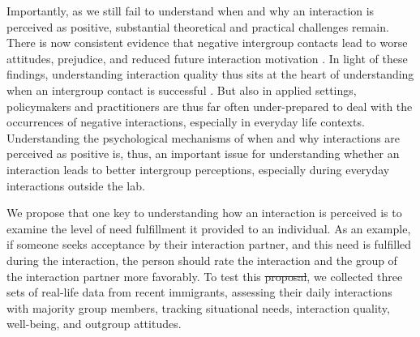 \documentclass[man, 12pt, a4paper, mask]{apa7}
\theoremstyle{break}
\theoremstyle{plain}
\providecommand{\DIFaddtex}[1]{{\protect\color{blue}\uwave{#1}}} %
\providecommand{\DIFdeltex}[1]{{\protect\color{red}\sout{#1}}}                      %
\providecommand{\DIFaddbegin}{} %
\providecommand{\DIFaddend}{} %
\providecommand{\DIFdelbegin}{} %
\providecommand{\DIFdelend}{} %
\providecommand{\DIFadd}[1]{\texorpdfstring{\DIFaddtex{#1}}{#1}} %
\providecommand{\DIFdel}[1]{\texorpdfstring{\DIFdeltex{#1}}{}} %
\newcommand{\DIFscaledelfig}{0.5}
\newlength{\DIFdelgraphicswidth} %
\newlength{\DIFdelgraphicsheight} %
\newcommand{\DIFaddincludegraphics}[2][]{{\color{blue}\fbox{\DIFOincludegraphics[#1]{#2}}}} %
\newcommand{\DIFdelincludegraphics}[2][]{%
\sbox{\DIFdelgraphicsbox}{\DIFOincludegraphics[#1]{#2}}%
\settoboxwidth{\DIFdelgraphicswidth}{\DIFdelgraphicsbox} %
\settoboxtotalheight{\DIFdelgraphicsheight}{\DIFdelgraphicsbox} %
\scalebox{\DIFscaledelfig}{%
\parbox[b]{\DIFdelgraphicswidth}{\usebox{\DIFdelgraphicsbox}\\[-\baselineskip] \rule{\DIFdelgraphicswidth}{0em}}\llap{\resizebox{\DIFdelgraphicswidth}{\DIFdelgraphicsheight}{%
\setlength{\unitlength}{\DIFdelgraphicswidth}%
\begin{picture}(1,1)%
\thicklines\linethickness{2pt} %
{\color[rgb]{1,0,0}\put(0,0){\framebox(1,1){}}}%
{\color[rgb]{1,0,0}\put(0,0){\line( 1,1){1}}}%
{\color[rgb]{1,0,0}\put(0,1){\line(1,-1){1}}}%
\end{picture}%
}\hspace*{3pt}}} %
} %
\DeclareRobustCommand{\DIFaddbegin}{\DIFOaddbegin \let\includegraphics\DIFaddincludegraphics} %
\DeclareRobustCommand{\DIFaddend}{\DIFOaddend \let\includegraphics\DIFOincludegraphics} %
\DeclareRobustCommand{\DIFdelbegin}{\DIFOdelbegin \let\includegraphics\DIFdelincludegraphics} %
\DeclareRobustCommand{\DIFdelend}{\DIFOaddend \let\includegraphics\DIFOincludegraphics} %
\begin{document}
Importantly, as we still fail to understand when and why an interaction is perceived as positive, substantial theoretical and practical challenges remain. There is now consistent evidence that negative intergroup contacts lead to worse attitudes, prejudice, and reduced future interaction motivation \citep[e.g.,][]{Barlow2012, Prati2021, Graf2014}. In light of these findings, understanding interaction quality thus sits at the heart of understanding when an intergroup contact is successful \citep[e.g.,][]{Allport1954b, Brown2007, Tropp2016}. But also in applied settings, policymakers and practitioners are thus far often under-prepared to deal with the occurrences of negative interactions, especially in everyday life contexts. Understanding the psychological mechanisms of when and why interactions are perceived as positive is, thus, an important issue for understanding whether an interaction leads to better intergroup perceptions, especially during everyday interactions outside the lab.

We propose that one key to understanding how an interaction is perceived is to examine the level of need fulfillment it provided to an individual. As an example, if someone seeks acceptance by their interaction partner, and this need is fulfilled during the interaction, the person should rate the interaction and the group of the interaction partner more favorably. To test this \DIFdelbegin \DIFdel{proposal}\DIFdelend \DIFaddbegin \DIFadd{idea}\DIFaddend , we collected three sets of real-life data from recent immigrants, assessing their daily interactions with majority group members, tracking situational needs, interaction quality, well-being, and outgroup attitudes. 
\end{document}
